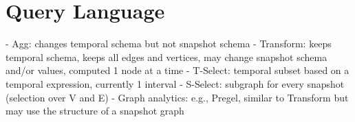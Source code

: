 \section{Query Language}
\label{sec:lang}

- Agg: changes temporal schema but not snapshot schema
- Transform: keeps temporal schema, keeps all edges and vertices, may change snapshot schema and/or values, computed 1 node at a time
- T-Select: temporal subset based on a temporal expression, currently 1 interval
- S-Select: subgraph for every snapshot (selection over V and E) 
- Graph analytics: e.g., Pregel, similar to Transform but may use the structure of a snapshot graph
